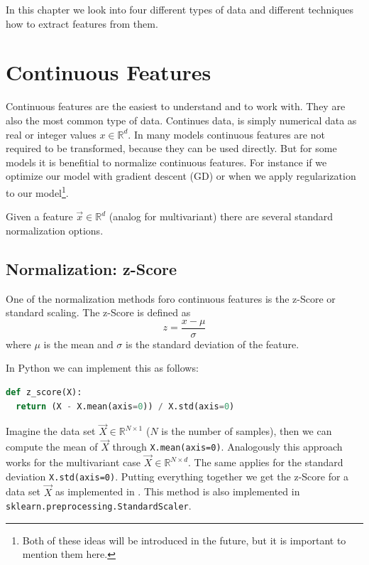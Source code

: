 In this chapter we look into four different types of data and different techniques how to extract features from them.

\section{Continuous Features}
Continuous features are the easiest to understand and to work with. They are also the most common type of data.
Continues data, is simply numerical data as real or integer values $x \in \mathbb{R}^d$. In many models continuous features are not required
to be transformed, because they can be used directly. But for some models it is benefitial to normalize continuous features.
For instance if we optimize our model with gradient descent (GD) or when we apply regularization to our model\footnote{Both of these ideas will be introduced in the future, but it is important to mention them here.}.

Given a feature $\vec{x} \in \mathbb{R}^d$ (analog for multivariant) there are several standard normalization options.
\subsection{Normalization: z-Score}
One of the normalization methods foro continuous features is the z-Score or standard scaling.
The z-Score is defined as
\begin{equation}
  z = \frac{x - \mu}{\sigma}
\end{equation}
where $\mu$ is the mean and $\sigma$ is the standard deviation of the feature.

In Python we can implement this as follows:
\begin{lstlisting}[language=Python, caption={z-Score in Python}, label={code:z-score}]
def z_score(X):
  return (X - X.mean(axis=0)) / X.std(axis=0)
\end{lstlisting}
Imagine the data set $\vec{X} \in \mathbb{R}^{N \times 1}$ ($N$ is the number of samples), then we can compute the mean of $\vec{X}$ through \lstinline{X.mean(axis=0)}.
Analogously this approach works for the multivariant case $\vec{X} \in \mathbb{R}^{N \times d}$.
The same applies for the standard deviation \lstinline{X.std(axis=0)}.
Putting everything together we get the z-Score for a data set $\vec{X}$ as implemented in .
This method is also implemented in \lstinline{sklearn.preprocessing.StandardScaler}.
